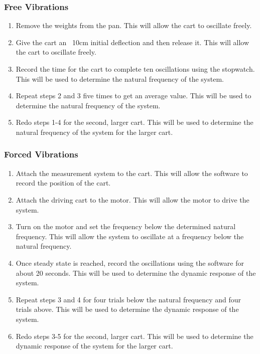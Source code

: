 \subsubsection{Free Vibrations}
\begin{enumerate}
    \item Remove the weights from the pan. This will allow the cart to oscillate freely.
    \item Give the cart an ~10cm initial deflection and then release it. This will allow the cart to oscillate freely.
    \item Record the time for the cart to complete ten oscillations using the stopwatch. This will be used to determine the natural frequency of the system.
    \item Repeat steps 2 and 3 five times to get an average value. This will be used to determine the natural frequency of the system.
    \item Redo steps 1-4 for the second, larger cart. This will be used to determine the natural frequency of the system for the larger cart.
\end{enumerate}

\subsubsection{Forced Vibrations}
\begin{enumerate}
    \item Attach the measurement system to the cart. This will allow the software to record the position of the cart.
    \item Attach the driving cart to the motor. This will allow the motor to drive the system.
    \item Turn on the motor and set the frequency below the determined natural frequency. This will allow the system to oscillate at a frequency below the natural frequency.
    \item Once steady state is reached, record the oscillations using the software for about 20 seconds. This will be used to determine the dynamic response of the system.
    \item Repeat steps 3 and 4 for four trials below the natural frequency and four trials above. This will be used to determine the dynamic response of the system.
    \item Redo steps 3-5 for the second, larger cart. This will be used to determine the dynamic response of the system for the larger cart.
\end{enumerate}